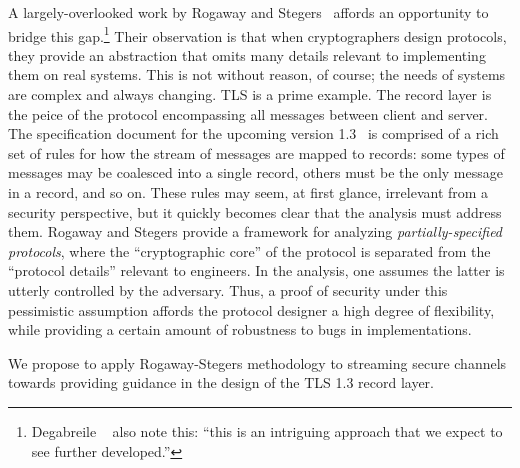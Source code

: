 A largely-overlooked work by Rogaway and Stegers~\cite{RS09}
affords an opportunity to bridge this gap.\footnote{Degabreile
  \etal~\cite{DPW11} also note this: ``this is an intriguing approach
  that we expect to see further developed.''} Their observation is that when
cryptographers design protocols, they provide an abstraction that omits many
details relevant to implementing them on real systems.
%
This is not without reason, of course; the needs of systems are complex and always
changing.
%
TLS is a prime example. The record layer is the peice of the protocol
encompassing all messages between client and server. The specification document
for the upcoming version 1.3~\cite{tls13} is comprised of a rich set of rules
for how the stream of messages are mapped to records: some types of messages may
be coalesced into a single record, others must be the only message in a record,
and so on. These rules may seem, at first glance, irrelevant from a security
perspective, but it quickly becomes clear that the analysis must address
them.
%
\fi
%
Rogaway and Stegers provide a framework for analyzing \emph{partially-specified
protocols}, where the ``cryptographic core'' of the protocol is separated from
the ``protocol details'' relevant to engineers. In the analysis, one assumes the
latter is utterly controlled by the adversary. Thus, a proof of security under
this pessimistic assumption affords the protocol designer a high degree of
flexibility, while providing a certain amount of robustness to bugs in
implementations.

\begin{task}\label{task:sc}
  We propose to apply Rogaway-Stegers methodology to streaming secure channels
  towards providing guidance in the design of the TLS 1.3 record layer.
\end{task}


